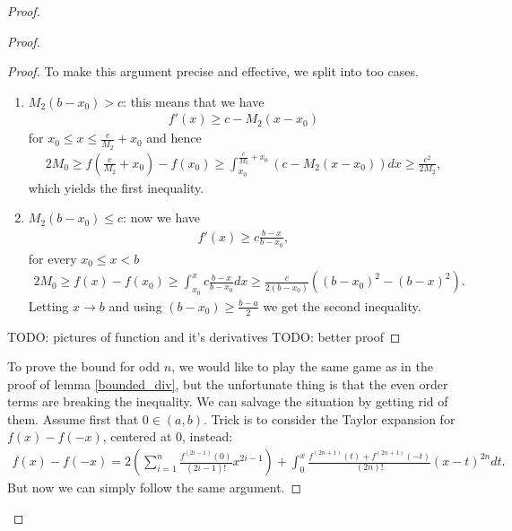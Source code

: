 \begin{proof}
\begin{proof}
\begin{proof}
			To make this argument precise and effective, we split into too cases.

			\begin{enumerate}
				\item $M_{2} (b - x_{0}) > c$: this means that we have
				\begin{align*}
					f'(x) \geq c - M_{2} (x - x_{0})
				\end{align*}
				for $x_{0} \leq x \leq \frac{c}{M_{2}} + x_{0}$ and hence
				\begin{align*}
					2 M_{0} \geq f\left(\frac{c}{M_{2}} + x_{0}\right) - f(x_{0}) \geq \int_{x_{0}}^{\frac{c}{M_{2}} + x_{0}} \left(c - M_{2} (x - x_{0})\right) dx \geq \frac{c^2}{2 M_{2}},
				\end{align*}
				which yields the first inequality.
				\item $M_{2} (b - x_{0}) \leq c$: now we have
				\begin{align*}
					f'(x) \geq c \frac{b - x}{b - x_{0}},
				\end{align*}
				for every $x_{0} \leq x < b$
				\begin{align*}
					2 M_{0} \geq f(x) - f(x_{0}) \geq \int_{x_{0}}^{x}  c \frac{b - x}{b - x_{0}} d x \geq \frac{c}{2(b - x_{0})} \left((b - x_{0})^2 - (b - x)^2\right).
				\end{align*}
				Letting $x \to b$ and using $(b - x_{0}) \geq \frac{b - a}{2}$ we get the second inequality.
			\end{enumerate}

			TODO: pictures of function and it's derivatives
			TODO: better proof
		\end{proof}

		To prove the bound for odd $n$, we would like to play the same game as in the proof of lemma \ref{bounded_div}, but the unfortunate thing is that the even order terms are breaking the inequality. We can salvage the situation by getting rid of them. Assume first that $0 \in (a, b)$. Trick is to consider the Taylor expansion for $f(x) - f(-x)$, centered at $0$, instead:
		\begin{align*}
			f(x) - f(-x) = 2 \left(\sum_{i = 1}^{n} \frac{f^{(2 i - 1)}(0)}{(2 i - 1)!}x^{2 i - 1}\right) + \int_{0}^{x} \frac{f^{(2 n + 1)}(t) + f^{(2 n + 1)}(-t)}{(2n)!} (x - t)^{2 n} dt.
		\end{align*}
		But now we can simply follow the same argument.
	\end{proof}


\end{proof}
